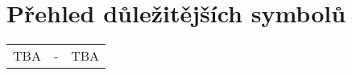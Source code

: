 \section*{Přehled důležitějších symbolů}

\begin{table}[ht!]
  \begin{tabular}{c c l}
    TBA  & - & TBA  \\
  \end{tabular}
\end{table}